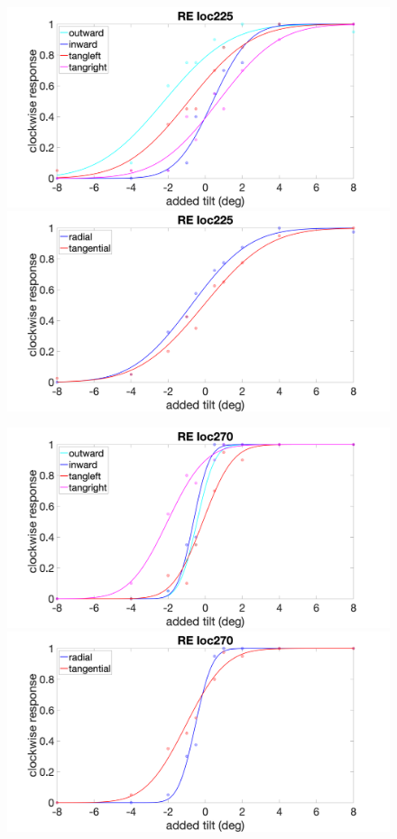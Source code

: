 \documentclass[11pt]{article} %
\begin{document}
\begin{figure}[H]
\centering %
\includegraphics[scale=.15]{Images/RE_PF_loc225_4conds.png}
\includegraphics[scale=.15]{Images/RE_PF_loc225_2conds.png}
\end{figure}
\begin{figure}[H]
\centering %
\includegraphics[scale=.15]{Images/RE_PF_loc270_4conds.png}
\includegraphics[scale=.15]{Images/RE_PF_loc270_2conds.png}
\end{figure}
\end{document}
